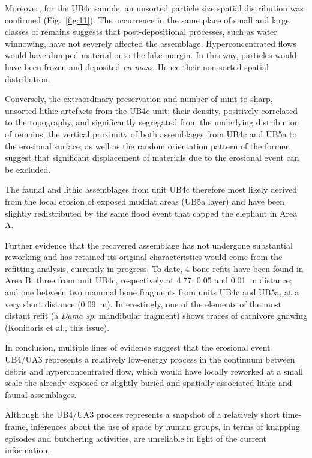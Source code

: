 \documentclass[review,authoryear,times]{elsarticle} %
\begin{document}
Moreover, for the UB4c sample, an unsorted particle size spatial distribution was confirmed (Fig.~\ref{fig:11}). The occurrence in the same place of small and large classes of remains suggests that post-depositional processes, such as water winnowing, have not severely affected the assemblage. Hyperconcentrated flows would have dumped material onto the lake margin. In this way, particles would have been frozen and deposited \emph{en mass}. Hence their non-sorted spatial distribution.

Conversely, the extraordinary preservation and number of mint to sharp, unsorted lithic artefacts from the UB4c unit; their density, positively correlated to the topography, and significantly segregated from the underlying distribution of remains; the vertical proximity of both assemblages from UB4c and UB5a to the erosional surface; as well as the random orientation pattern of the former, suggest that significant displacement of materials due to the erosional event can be excluded.

The faunal and lithic assemblages from unit UB4c therefore most likely derived from the local erosion of exposed mudflat areas (UB5a layer) and have been slightly redistributed by the same flood event that capped the elephant in Area A.

Further evidence that the recovered assemblage has not undergone substantial reworking and has retained its original characteristics would come from the refitting analysis, currently in progress. To date, 4 bone refits have been found in Area B: three from unit UB4c, respectively at 4.77, 0.05 and 0.01~m distance; and one between two mammal bone fragments from units UB4c and UB5a, at a very short distance (0.09~m). Interestingly, one of the elements of the most distant refit (a \emph{Dama sp.} mandibular fragment) shows traces of carnivore gnawing (Konidaris et al., this issue).

In conclusion, multiple lines of evidence suggest that the erosional event UB4/UA3 represents a relatively low-energy process in the continuum between debris and hyperconcentrated flow, which would have locally reworked at a small scale the already exposed or slightly buried and spatially associated lithic and faunal assemblages.

Although the UB4/UA3 process represents a snapshot of a relatively short time-frame, inferences about the use of space by human groups, in terms of knapping episodes and butchering activities, are unreliable in light of the current information.
\end{document}

